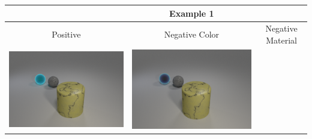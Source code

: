 \begin{table}\centering
{}
\begin{tabular}{@{}ccc@{}}\toprule
&\textbf{Example 1}&\\
\midrule
Positive & Negative Color & Negative Material \\
    \begin{minipage}{.3\textwidth}
      \includegraphics[width=\linewidth]{figures/clevr_datasets/sclevr_ori1.png}
    \end{minipage}
    &
    \begin{minipage}{.3\textwidth}
      \includegraphics[width=\linewidth]{figures/clevr_datasets/sclevr_col1.png}
    \end{minipage}
    &
    \begin{minipage}{.3\textwidth}

\end{minipage}
\end{tabular}
\end{table}
